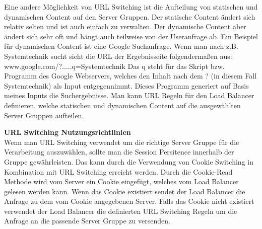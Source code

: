 Eine andere Möglichkeit von URL Switching ist die Aufteilung von statischen und dynamischen Content auf den Server Gruppen. Der statische Content ändert sich relativ selten und ist auch einfach zu verwalten. Der dynamische Content aber ändert sich sehr oft und hängt auch teilweise von der Useranfrage ab. 
Ein Beispiel für dynamischen Content ist eine Google Suchanfrage. Wenn man nach z.B. Systemtechnik sucht sieht die URL der Ergebnisseite folgendermaßen aus: 
www.google.com/?.....q=Systemtechnik
Das q steht für das Skript bzw. Programm des Google Webservers, welches den Inhalt nach dem ? (in diesem Fall Systemtechnik) als Input entgegennimmt. Dieses Programm generiert auf Basis meines Inputs die Suchergebnisse.
Man kann URL Regeln für den Load Balancer definieren, welche statischen und dynamischen Content auf die ausgewählten Server Gruppen aufteilen.\vspace{5mm}

\textbf{URL Switching Nutzungsrichtlinien} \\

Wenn man URL Switching verwendet um die richtige Server Gruppe für die Verarbeitung auszuwählen, sollte man die Session Persitence innerhalb der Gruppe gewährleisten. Das kann durch die Verwendung von Cookie Switching in Kombination mit URL Switching erreicht werden. Durch die Cookie-Read Methode wird vom Server ein Cookie eingefügt, welches vom Load Balancer gelesen werden kann. Wenn das Cookie existiert sendet der Load Balancer die Anfrage zu dem vom Cookie angegebenen Server. Falls das Cookie nicht existiert verwendet der Load Balancer die definierten URL Switching Regeln um die Anfrage an die passende Server Gruppe zu versenden. \cite{LoadBalancing2}

